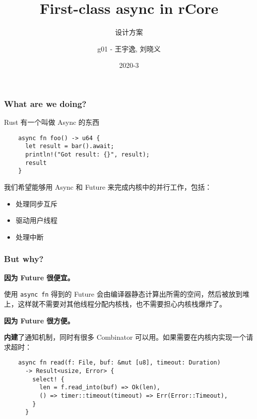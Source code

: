 \documentclass[UTF-8]{ctexbeamer}
\title{First-class async in rCore}
\subtitle{设计方案}
\author{g01 - 王宇逸, 刘晓义}
\date{2020-3}
\begin{document}
\begin{frame}
  \titlepage
\end{frame}

\begin{frame}[fragile]
  \frametitle{What are we doing?}

  Rust 有一个叫做 Async 的东西

  \begin{verbatim}
    async fn foo() -> u64 {
      let result = bar().await;
      println!("Got result: {}", result);
      result
    }
  \end{verbatim}

  \vspace{1em}

  我们希望能够用 Async 和 Future 来完成内核中的并行工作，包括：
  \begin{itemize}
    \item 处理同步互斥
    \item 驱动用户线程
    \item 处理中断
  \end{itemize}
\end{frame}

\begin{frame}[fragile]
  \frametitle{But why?}

  \textbf{因为 Future 很便宜。}

  使用 \texttt{async fn} 得到的 Future 会由编译器静态计算出所需的空间，然后被放到堆上，这样就不需要对其他线程分配内核栈，也不需要担心内核栈爆炸了。

  \vspace{1em}

  \textbf{因为 Future 很方便。}

  \textbf{内建}了通知机制，同时有很多 Combinator 可以用。如果需要在内核内实现一个请求超时：

  {
  \scriptsize
  \begin{verbatim}
    async fn read(f: File, buf: &mut [u8], timeout: Duration)
      -> Result<usize, Error> {
        select! {
          len = f.read_into(buf) => Ok(len),
          () => timer::timeout(timeout) => Err(Error::Timeout),
        }
      }
  \end{verbatim}
  }
\end{frame}
\end{document}
